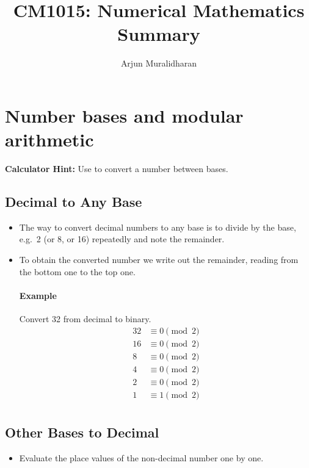
\title{CM1015: Numerical Mathematics \\ Summary}
\author{Arjun Muralidharan}



\section{Number bases and modular arithmetic}
\begin{mdframed}
\textbf{Calculator Hint:} Use  to convert a number between bases.
\end{mdframed}
\subsection{Decimal to Any Base}

\begin{itemize}

	\item The way to convert decimal numbers to any base is to divide by the base, e.g.\
	      2 (or 8, or 16) repeatedly and note the remainder.
	\item To obtain the converted number we write out the remainder, reading
	      from the bottom one to the top one.

	      \paragraph{Example}
	      Convert 32 from decimal to binary.
	      \begin{align*}
	      	32 & \equiv 0 \pmod{2} \\
	      	16 & \equiv 0 \pmod{2} \\
	      	8  & \equiv 0 \pmod{2} \\
	      	4  & \equiv 0 \pmod{2} \\
	      	2  & \equiv 0 \pmod{2} \\
	      	1  & \equiv 1 \pmod{2} \\
	      \end{align*}

\end{itemize}

\subsection{Other Bases to Decimal}
\begin{itemize}
	\item Evaluate the place values of the non-decimal number one by one.
\end{itemize}

